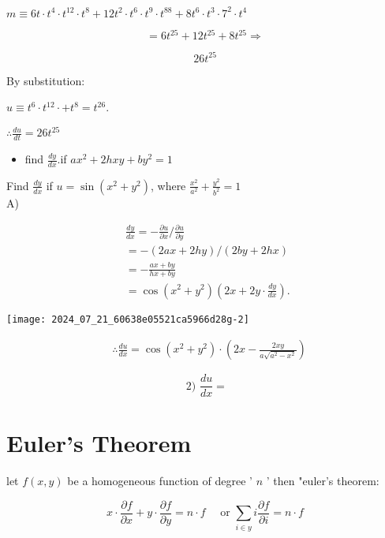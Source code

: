 \documentclass[12pt, a4paper]{article}
\begin{document}
$m \equiv 6 t \cdot t^{4} \cdot t^{12} \cdot t^{8}+12 t^{2} \cdot t^{6} \cdot t^{9} \cdot t^{88}+8 t^{6} \cdot t^{3} \cdot 7^{2} \cdot t^{4}$

$$
=6 t^{25}+12 t^{25}+8 t^{25} \Rightarrow
$$

$$
26 t^{25}
$$

By substitution:

$u \equiv t^{6} \cdot t^{12} \cdot+t^{8}=t^{26}$.

$\therefore \frac{d u}{d t}=26 t^{25}$

\begin{itemize}
  \item find $\frac{d y}{d x}$.if $a x^{2}+2 h x y+b y^{2}=1$
\end{itemize}

Find $\frac{d y}{d x}$ if $u=\sin \left(x^{2}+y^{2}\right)$, where $\frac{x^{2}}{a^{2}}+\frac{y^{2}}{b^{2}}=1$\\
A)

$$
\begin{aligned}
& \frac{d y}{d x}=-\frac{\partial u}{\partial x} / \frac{\partial u}{\partial y} \\
& =-(2 a x+2 h y) /(2 b y+2 h x) \\
& =-\frac{a x+b y}{h x+b y} \\
& =\cos \left(x^{2}+y^{2}\right)\left(2 x+2 y \cdot \frac{d y}{d x}\right) \text {. }
\end{aligned}
$$

\begin{center}
\texttt{[image: 2024\_07\_21\_60638e05521ca5966d28g-2]}
\end{center}

$$
\begin{aligned}
& \therefore \frac{d u}{d x}=\cos \left(x^{2}+y^{2}\right) \cdot\left(2 x-\frac{2 x y}{a \sqrt{a^{2}-x^{2}}}\right)
\end{aligned}
$$

$$
\text { 2) } \frac{d u}{d x}=
$$

\section*{Euler's Theorem}
let $f(x, y)$ be a homogeneous function of degree ' $n$ ' then "euler's theorem:

$$
x \cdot \frac{\partial f}{\partial x}+y \cdot \frac{\partial f}{\partial y}=n \cdot f \quad \text { or } \sum_{i \in y} i \frac{\partial f}{\partial i}=n \cdot f
$$
\end{document}
